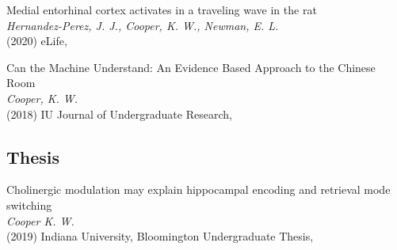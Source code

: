 \documentclass[10pt]{cooperCV2}
\begin{document}
\begin{etaremune}[ resume, itemindent=-\bibhang, topsep=0pt,
				   itemsep=\bibsep,partopsep=0pt,parsep=0pt,leftmargin={\bibhang+\widthof{[999]}}]
	
    \item Medial entorhinal cortex activates in a traveling wave in the rat \\
     \textit{Hernandez-Perez, J. J., Cooper, K. W., Newman, E. L.}\\
     (2020) eLife, 
     
	
    \item Can the Machine Understand: An Evidence Based Approach to the Chinese Room \\
     \textit{Cooper, K. W.}\\
     (2018) IU Journal of Undergraduate Research, 
     
	

\end{etaremune}






 










\vspace{0.1in}
\subsection{Thesis} 

\begin{etaremune}[resume,  itemindent=-\bibhang, topsep=0pt,
				   itemsep=\bibsep,partopsep=0pt,parsep=0pt,leftmargin={\bibhang+\widthof{[999]}}] 
    
    \item Cholinergic modulation may explain hippocampal encoding and retrieval mode switching \\
     \textit{Cooper K. W.}\\
     (2019) Indiana University, Bloomington Undergraduate Thesis, 
     
	

\end{etaremune}






















\end{document}
